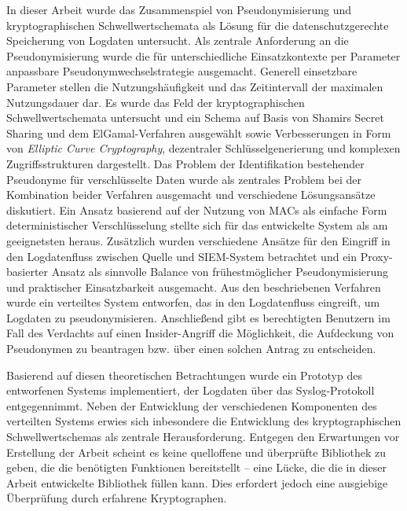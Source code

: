 In dieser Arbeit wurde das Zusammenspiel von Pseudonymisierung und kryptographischen Schwellwertschemata als Lösung für die datenschutzgerechte Speicherung von Logdaten untersucht. 
Als zentrale Anforderung an die Pseudonymisierung wurde die für unterschiedliche Einsatzkontexte per Parameter anpassbare Pseudonymwechselstrategie ausgemacht. Generell einsetzbare Parameter stellen die Nutzungshäufigkeit und das Zeitintervall der maximalen Nutzungsdauer dar. 
Es wurde das Feld der kryptographischen Schwellwertschemata untersucht und ein Schema auf Basis von Shamirs Secret Sharing und dem ElGamal-Verfahren ausgewählt sowie Verbesserungen in Form von \textit{Elliptic Curve Cryptography}, dezentraler Schlüsselgenerierung und komplexen Zugriffsstrukturen dargestellt.
Das Problem der Identifikation bestehender Pseudonyme für verschlüsselte Daten wurde als zentrales Problem bei der Kombination beider Verfahren ausgemacht und verschiedene Lösungsansätze diskutiert. Ein Ansatz basierend auf der Nutzung von MACs als einfache Form deterministischer Verschlüsselung stellte sich für das entwickelte System als am geeignetsten heraus.
Zusätzlich wurden verschiedene Ansätze für den Eingriff in den Logdatenfluss zwischen Quelle und SIEM-System betrachtet und ein Proxy-basierter Ansatz als sinnvolle Balance von frühestmöglicher Pseudonymisierung und praktischer Einsatzbarkeit ausgemacht.
Aus den beschriebenen Verfahren wurde ein verteiltes System entworfen, das in den Logdatenfluss eingreift, um Logdaten zu pseudonymisieren. Anschließend gibt es berechtigten Benutzern im Fall des Verdachts auf einen Insider-Angriff die Möglichkeit, die Aufdeckung von Pseudonymen zu beantragen bzw. über einen solchen Antrag zu entscheiden.

Basierend auf diesen theoretischen Betrachtungen wurde ein Prototyp des entworfenen Systems implementiert, der Logdaten über das Syslog-Protokoll entgegennimmt. Neben der Entwicklung der verschiedenen Komponenten des verteilten Systems erwies sich inbesondere die Entwicklung des kryptographischen Schwellwertschemas als zentrale Herausforderung. Entgegen den Erwartungen vor Erstellung der Arbeit scheint es keine quelloffene und überprüfte Bibliothek zu geben, die die benötigten Funktionen bereitstellt -- eine Lücke, die die in dieser Arbeit entwickelte Bibliothek füllen kann. Dies erfordert jedoch eine ausgiebige Überprüfung durch erfahrene Kryptographen.

